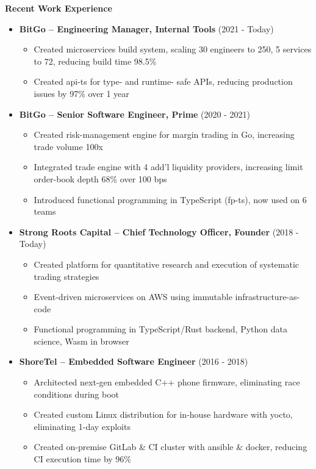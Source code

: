 \documentclass{report}
\begin{document}
\textbf{Recent Work Experience}
\begin{itemize}[label=]

\item \textbf{BitGo -- Engineering Manager, Internal Tools} (2021 - Today)
  \begin{itemize}[label=$\circ$]
  \item Created microservices build system, scaling 30 engineers to 250, 5 services to 72, reducing build time 98.5\%
  \item Created api-ts for type- and runtime- safe APIs, reducing production issues by 97\% over 1 year
  \end{itemize}

\item \textbf{BitGo -- Senior Software Engineer, Prime} (2020 - 2021)
  \begin{itemize}[label=$\circ$]
  \item Created risk-management engine for margin trading in Go, increasing trade volume 100x
  \item Integrated trade engine with 4 add'l liquidity providers, increasing limit order-book depth 68\% over 100 bps
  \item Introduced functional programming in TypeScript (fp-ts), now used on 6 teams
  \end{itemize}

\item \textbf{Strong Roots Capital -- Chief Technology Officer, Founder} (2018 - Today)
  \begin{itemize}[label=$\circ$]
  \item Created platform for quantitative research and execution of systematic trading strategies
  \item Event-driven microservices on AWS using immutable infrastructure-as-code
  \item Functional programming in TypeScript/Rust backend, Python data science, Wasm in browser
  \end{itemize}

\item \textbf{ShoreTel -- Embedded Software Engineer} (2016 - 2018)
  \begin{itemize}[label=$\circ$]
  \item Architected next-gen embedded C++ phone firmware, eliminating race conditions during boot
  \item Created custom Linux distribution for in-house hardware with yocto, eliminating 1-day exploits
  \item Created on-premise GitLab \& CI cluster with ansible \& docker, reducing CI execution time by 96\%
  \end{itemize}


\end{itemize}
\end{document}
